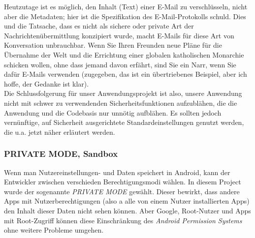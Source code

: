 \documentclass[a4paper,11pt]{article}
\begin{document}
Heutzutage ist es möglich, den Inhalt (Text) einer E-Mail zu verschlüsseln, nicht aber die Metadaten; hier ist die Spezifikation des E-Mail-Protokolls schuld. Dies und die Tatsache, dass es nicht als sichere oder private Art der Nachrichtenübermittlung konzipiert wurde, macht E-Mails für diese Art von Konversation unbrauchbar. Wenn Sie Ihren Freunden neue Pläne für die Übernahme der Welt und die Errichtung einer globalen katholischen Monarchie schicken wollen, ohne dass jemand davon erfährt, sind Sie ein Narr, wenn Sie dafür E-Mails verwenden (zugegeben, das ist ein übertriebenes Beispiel, aber ich hoffe, der Gedanke ist klar).\\

Die Schlussfolgerung für unser Anwendungsprojekt ist also, unsere Anwendung nicht mit schwer zu verwendenden Sicherheitsfunktionen aufzublähen, die die Anwendung und die Codebasis nur unnötig aufblähen. Es sollten jedoch vernünftige, auf Sicherheit ausgerichtete Standardeinstellungen genutzt werden, die u.a. jetzt näher erläutert werden.

\subsubsection{PRIVATE MODE, Sandbox}
Wenn man Nutzereinstellungen- und Daten speichert in Android, kann der Entwickler zwischen verschieden Berechtigungsmodi wählen. In diesem Project wurde der sogenannte \textit{PRIVATE MODE} gewählt. Dieser bewirkt, dass andere Apps mit Nutzerberechtigungen (also a alle von einem Nutzer installierten Apps) den Inhalt dieser Daten nicht sehen können. Aber Google, Root-Nutzer und Apps mit Root-Zugriff können diese Einschränkung des \textit{Android Permission Systems} ohne weitere Probleme umgehen.\\
\end{document}
